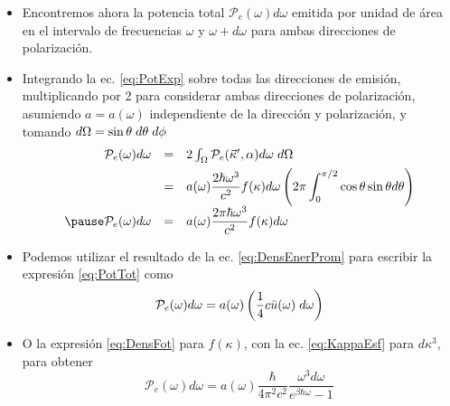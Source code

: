 \documentclass[aspectratio=1610]{beamer}
\newcommand{\kv}{\Vec{\kappa}}
\begin{document}
\begin{frame}
	\begin{itemize}
		\item Encontremos ahora la potencia total $\mathcal{P}_e(\omega)d\omega$ emitida por unidad de área en el intervalo de frecuencias $\omega$ y $\omega+d\omega$ para ambas direcciones de polarización.\pause
		\item Integrando la ec. \ref{eq:PotExp} sobre todas las direcciones de emisión, multiplicando por 2 para considerar ambas direcciones de polarización, asumiendo $a = a(\omega)$ independiente de la dirección y polarización, y tomando $d\Omega = \sin{\theta} \hspace{1mm} d\theta \hspace{1mm} d\phi$\pause
		\begin{equation}
			\begin{array}{rcl}
				\mathcal{P}_e(\omega)d\omega &=& 2\int_\Omega \mathcal{P}_e(\kv',\alpha) d\omega\hspace{1mm}d\Omega \\[1ex]
				&=& a(\omega)\dfrac{2\hbar\omega^3}{c^2}f(\kappa)d\omega\left(2\pi\displaystyle\int_0^{\pi/2}\cos{\theta}\sin{\theta}d\theta\right) \\[1ex]\pause
				\mathcal{P}_e(\omega)d\omega &=& a(\omega)\dfrac{2\pi\hbar\omega^3}{c^2}f(\kappa)d\omega
			\end{array}
			\label{eq:PotTot}
		\end{equation}
	\end{itemize}
\end{frame}

\begin{frame}
	\begin{itemize}
		\item Podemos utilizar el resultado de la ec. \ref{eq:DensEnerProm} para escribir la expresión \ref{eq:PotTot} como
		\begin{equation}
			\mathcal{P}_e(\omega)d\omega = a(\omega)\left(\frac{1}{4}c\bar{u}(\omega)\hspace{1mm}d\omega\right)
		\end{equation}\pause
		\item O la expresión \ref{eq:DensFot} para $f(\kappa)$, con la ec. \ref{eq:KappaEsf} para $d\kappa^3$, para obtener
		\begin{equation}
			\mathcal{P}_e(\omega)d\omega = a(\omega)\frac{\hbar}{4\pi^2c^2}\frac{\omega^3d\omega}{e^{\beta\hbar\omega}-1}
		\end{equation}
	\end{itemize}
\end{frame}
\end{document}
